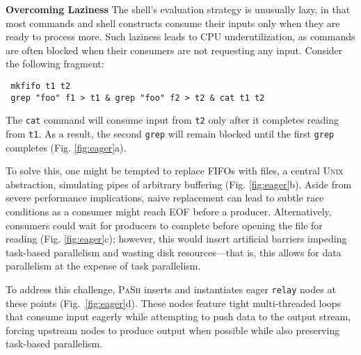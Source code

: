 \documentclass[sigplan, review, screen, anonymous]{acmart}
\newcommand{\heading}[1]{\vspace{4pt}\noindent\textbf{#1}\enspace}
\newcommand{\ttt}[1]{\texttt{#1}}
\newcommand{\kk}[1]{[{\color{magenta}kk: #1}]}
\newcommand{\sys}{{\scshape PaSh}\xspace}
\newcommand{\unix}{{\scshape Unix}\xspace}
\begin{document}
\heading{Overcoming Laziness}
The shell's evaluation strategy is unusually lazy, in that most commands and shell constructs consume their inputs only when they are ready to process more.
Such laziness leads to CPU underutilization, as commands are often blocked when their consumers are not requesting any input.
Consider the following fragment:

\begin{verbatim}
 mkfifo t1 t2
 grep "foo" f1 > t1 & grep "foo" f2 > t2 & cat t1 t2
\end{verbatim}

\noindent
The \ttt{cat} command will consume input from \ttt{t2} only after it completes reading from \ttt{t1}.
As a result, the second \ttt{grep} will remain blocked until the first \ttt{grep} completes (Fig. \ref{fig:eager}a). %

To solve this, one might be tempted to replace FIFOs with files, a central \unix abstraction, simulating pipes of arbitrary buffering (Fig. \ref{fig:eager}b).
Aside from severe performance implications, naive replacement can lead to subtle race conditions as a consumer might reach {\sc EOF} before a producer.
Alternatively, consumers could wait for producers to complete before opening the file for reading (Fig. \ref{fig:eager}c);
  however, this would insert artificial barriers impeding task-based parallelism and wasting disk resources---that is, this allows for data parallelism at the expense of task parallelism.

To address this challenge,
  \sys inserts and instantiates eager \ttt{relay} nodes at these points (Fig.~\ref{fig:eager}d). %
These nodes feature tight multi-threaded loops that consume input eagerly while attempting to push data to the output stream, forcing upstream nodes to produce output when possible while also preserving task-based parallelism.
\end{document}
